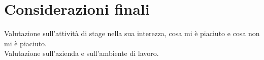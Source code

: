 \section{Considerazioni finali}
\label{sec:considetazioni-finali}

Valutazione sull'attività di stage nella sua interezza, cosa mi è piaciuto e cosa non mi è piaciuto. \\
Valutazione sull'azienda e sull'ambiente di lavoro. \\
